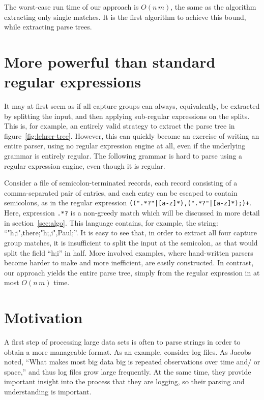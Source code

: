 \documentclass[11pt,a4paper,twoside,openright]{Thesis}
\theoremstyle{definition}
\newcommand{\Figref}[1]{figure~\ref{fig:#1}}
\newcommand{\Secref}[1]{section~\ref{sec:#1}}
\newcommand{\seclabel}[1]{\label{sec:#1}}
\begin{document}
The worst-case run time of our approach is $O(n\,m)$, the same as the 
algorithm extracting only single matches. It is the first algorithm to achieve
this bound, while extracting parse trees.

\section{More powerful than standard regular expressions}
\seclabel{power}
It may at first seem as if all capture groups can always, equivalently,
be extracted by splitting the input, and then applying sub-regular
expressions on the splits.  This is, for example, an entirely valid
strategy to extract the parse tree in \Figref{lehrer-tree}.  However,
this can quickly become an exercise of writing an entire parser,
using no regular expression engine at all, even if the underlying
grammar is entirely regular.  The following grammar is hard to parse
using a regular expression engine, even though it is regular.

Consider a file of semicolon-terminated records, each record consisting
of a comma-separated pair of entries, and each entry can be escaped
to contain semicolons, as in the regular expression
\texttt{((".*?"|[a-z]*),(".*?"|[a-z]*);)+}. Here, expression
\texttt{.*?} is a non-greedy match which will be discussed in more
detail in \Secref{algo}.  This language contains, for example, the
string: ``"h;i",there;"h;,i",Paul;''.  It is easy to see that, in
order to extract all four capture group matches, it is insufficient
to split the input at the semicolon, as that would split the field
``h;i'' in half.  More involved examples, where hand-written parsers
become harder to make and more inefficient, are easily constructed.
In contrast, our approach yields the entire parse tree, simply from
the regular expression in at most $O(n\,m)$ time.

\section{Motivation}

A first step of processing large data sets is often to parse strings in order 
to obtain a more manageable format. As an example, consider log files.  As
Jacobs\cite{Jaco09a} noted, ``What makes most big data big is repeated
observations over time and/ or space,'' and thus log files grow large
frequently. At the same time, they provide important insight into the process
that they are logging, so their parsing and understanding is important. 
\end{document}
